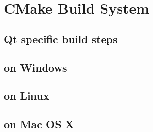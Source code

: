 \section{CMake Build System}

\subsection{Qt specific build steps}

\subsection{on Windows}

\subsection{on Linux}

\subsection{on Mac OS X} 
